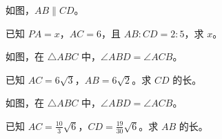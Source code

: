 \documentclass{exam-zh}
\begin{document}

\begin{problem}[points=10]
  \noindent
  \begin{minipage}[t]{\dimexpr\linewidth-60mm-6mm\relax}
    \vspace{0pt}
    如图，$AB\parallel CD$。

已知 $PA=x$，$AC=6$，且 $AB:CD=2:5$，求 $x$。
    
  \end{minipage}\hfill
  \begin{diagramcoltikz}{60mm}{}
  }
  \end{diagramcoltikz}
  \par\medskip
  \answerarea[48mm]
\end{problem}



\begin{problem}[points=10]
  \noindent
  \begin{minipage}[t]{\dimexpr\linewidth-60mm-6mm\relax}
    \vspace{0pt}
    如图，在 $\triangle ABC$ 中，$\angle ABD=\angle ACB$。

已知 $AC=6\sqrt{3}$，$AB=6\sqrt{2}$。求 $CD$ 的长。
    
  \end{minipage}\hfill
  \begin{diagramcoltikz}{60mm}{}
  }
  \end{diagramcoltikz}
  \par\medskip
  \answerarea[54mm]
\end{problem}



\begin{problem}[points=10]
  \noindent
  \begin{minipage}[t]{\dimexpr\linewidth-60mm-6mm\relax}
    \vspace{0pt}
    如图，在 $\triangle ABC$ 中，$\angle ABD=\angle ACB$。

已知 $AC=\frac{10}{3}\sqrt{6}$，$CD=\frac{19}{30}\sqrt{6}$。求 $AB$ 的长。
    
  \end{minipage}\hfill
  \begin{diagramcoltikz}{60mm}{}
  }
  \end{diagramcoltikz}
  \par\medskip
  \answerarea[54mm]
\end{problem}
\end{document}
